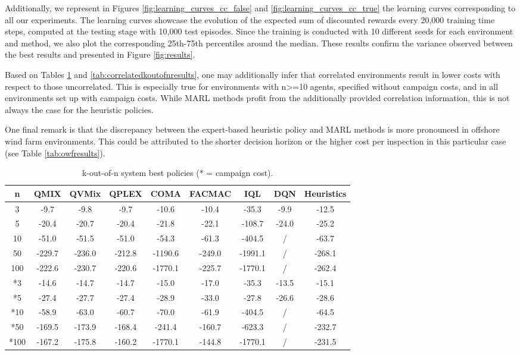Additionally, we represent in Figures \ref{fig:learning_curves_cc_false} and \ref{fig:learning_curves_cc_true} the learning curves corresponding to all our experiments.
The learning curves showcase the evolution of the expected sum of discounted rewards every 20,000 training time steps, computed at the testing stage with 10,000 test episodes.
Since the training is conducted with 10 different seeds for each environment and method, we also plot the corresponding 25th-75th percentiles around the median.
These results confirm the variance observed between the best results and presented in Figure \ref{fig:results}.

Based on Tables \ref{tab:koutofnresults} and \ref{tab:correlatedkoutofnresults}, one may additionally infer that correlated environments result in lower costs with respect to those uncorrelated.
This is especially true for environments with n>=10 agents, specified without campaign costs, and in all environments set up with campaign costs.
While MARL methods profit from the additionally provided correlation information, this is not always the case for the heuristic policies.

One final remark is that the discrepancy between the expert-based heuristic policy and MARL methods is more pronounced in offshore wind farm environments. 
This could be attributed to the shorter decision horizon or the higher cost per inspection in this particular case (see Table \ref{tab:owfresults}).

\newpage
\begin{table}
\centering
\caption{k-out-of-n system best policies (* = campaign cost).}
\label{tab:koutofnresults}
\setlength\tabcolsep{4.5pt}
\begin{tabular}{c|ccccccc|c}
\toprule
n & QMIX & QVMix & QPLEX & COMA & FACMAC & IQL & DQN & Heuristics \\
\midrule
3 & -9.7 & -9.8 & -9.7 & -10.6 & -10.4 & -35.3 & -9.9 & -12.5 \\
5 & -20.4 & -20.7 & -20.4 & -21.8 & -22.1 & -108.7 & -24.0 & -25.2 \\
10 & -51.0 & -51.5 & -51.0 & -54.3 & -61.3 & -404.5 & / & -63.7 \\
50 & -229.7 & -236.0 & -212.8 & -1190.6 & -249.0 & -1991.1 & / & -268.1 \\
100 & -222.6 & -230.7 & -220.6 & -1770.1 & -225.7 & -1770.1 & / & -262.4 \\
\midrule
*3 & -14.6 & -14.7 & -14.7 & -15.0 & -17.0 & -35.3 & -13.5 & -15.1 \\
*5 & -27.4 & -27.7 & -27.4 & -28.9 & -33.0 & -27.8 & -26.6 & -28.6 \\
*10 & -58.9 & -63.0 & -60.7 & -70.0 & -61.9 & -404.5 & / & -64.5 \\
*50 & -169.5 & -173.9 & -168.4 & -241.4 & -160.7 & -623.3 & / & -232.7 \\
*100 & -167.2 & -175.8 & -160.2 & -1770.1 & -144.8 & -1770.1 & / & -231.5 \\
\bottomrule
\end{tabular}
\end{table}



